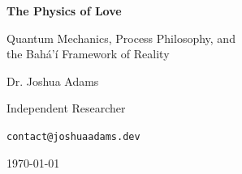 \begin{titlepage}
\centering
\vspace*{2cm}
{\Huge\bfseries The Physics of Love\par}
\vspace{1cm}
{\Large Quantum Mechanics, Process Philosophy, and\\
the Bahá'í Framework of Reality\par}
\vspace{2cm}
{\large Dr. Joshua Adams \par}
\vspace{0.5cm}
{\normalsize Independent Researcher\par}
{\normalsize \texttt{contact@joshuaadams.dev}\par}
\vfill
{\large \today\par}
\end{titlepage}
